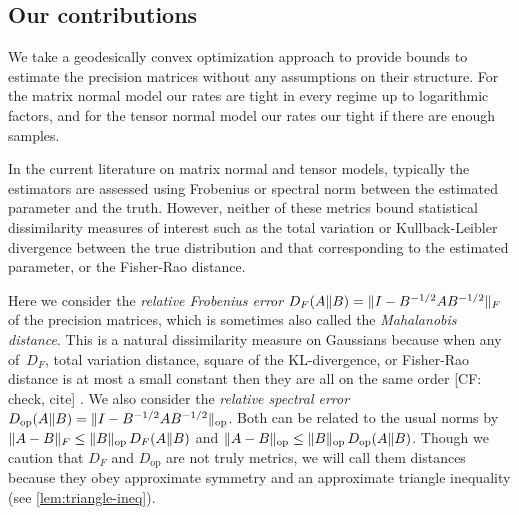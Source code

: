 \documentclass[aos]{imsart}
\theoremstyle{definition}
\numberwithin{equation}{section}
\DeclareMathOperator{\op}{op}
\DeclarePairedDelimiter{\norm}{\lVert}{\rVert}
\newcommand{\CF}[1]{{\color{purple}[CF: #1]}}
\begin{document}
\subsection{Our contributions}
We take a geodesically convex optimization approach to provide bounds to estimate the precision matrices without any assumptions on their structure.
For the matrix normal model our rates are tight in every regime up to logarithmic factors, and for the tensor normal model our rates our tight if there are enough samples.

In the current literature on matrix normal and tensor models, typically the estimators are assessed using Frobenius or spectral norm between the estimated parameter and the truth.
However, neither of these metrics bound statistical dissimilarity measures of interest such as the total variation or Kullback-Leibler divergence between the true distribution and that corresponding to the estimated parameter, or the Fisher-Rao distance.

Here we consider the \emph{relative Frobenius error} $D_F(A \Vert B) = \norm{I - B^{-1/2} A B^{-1/2}}_F$ of the precision matrices, which is sometimes also called the \emph{Mahalanobis distance}.
This is a natural dissimilarity measure on Gaussians because when any of~$D_F$, total variation distance, square of the KL-divergence, or Fisher-Rao distance is at most a small constant then they are all on the same order \CF{check, cite} \citep{barsov1987estimates}.
We also consider the \emph{relative spectral error} $D_{\op}(A \Vert B) = \norm{I - B^{-1/2} A B^{-1/2}}_{\op}$. 
Both can be related to the usual norms by $\norm{A - B}_F \leq \norm{B}_{\op} \, D_F(A\Vert B)$ and $\norm{A  - B}_{\op} \leq \norm{B}_{\op} \, D_{\op}(A \Vert B)$.
Though we caution that $D_F$ and $D_{\op}$ are not truly metrics, we will call them distances because they obey approximate symmetry and an approximate triangle inequality (see \cref{lem:triangle-ineq}).
\end{document}
